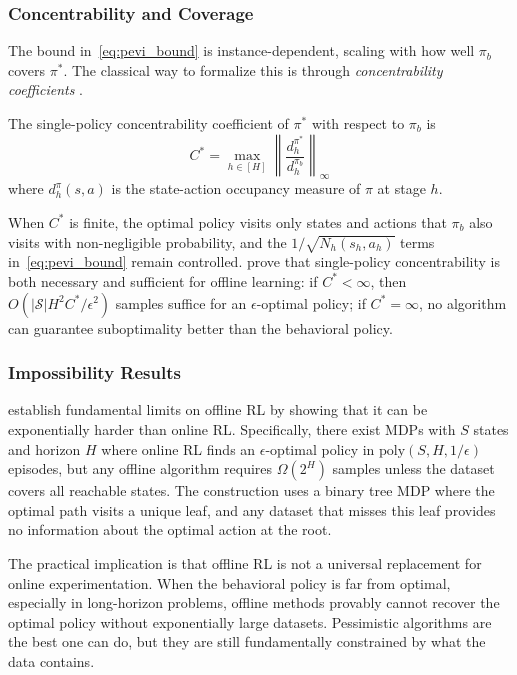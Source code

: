 \subsubsection{Concentrability and Coverage}

The bound in~\eqref{eq:pevi_bound} is instance-dependent, scaling with how well $\pi_b$ covers $\pi^*$. The classical way to formalize this is through \textit{concentrability coefficients} \citep{Munos2008}.

\begin{definition}
\label{def:concentrability}
The single-policy concentrability coefficient of $\pi^*$ with respect to $\pi_b$ is
\begin{equation}
C^* = \max_{h \in [H]} \left\| \frac{d_h^{\pi^*}}{d_h^{\pi_b}} \right\|_\infty
\end{equation}
where $d_h^{\pi}(s,a)$ is the state-action occupancy measure of $\pi$ at stage $h$.
\end{definition}

When $C^*$ is finite, the optimal policy visits only states and actions that $\pi_b$ also visits with non-negligible probability, and the $1/\sqrt{N_h(s_h, a_h)}$ terms in~\eqref{eq:pevi_bound} remain controlled. \citet{Rashidinejad2021} prove that single-policy concentrability is both necessary and sufficient for offline learning: if $C^* < \infty$, then $O(|\mathcal{S}| H^2 C^* / \epsilon^2)$ samples suffice for an $\epsilon$-optimal policy; if $C^* = \infty$, no algorithm can guarantee suboptimality better than the behavioral policy.

\subsubsection{Impossibility Results}

\citet{Zanette2021} establish fundamental limits on offline RL by showing that it can be exponentially harder than online RL. Specifically, there exist MDPs with $S$ states and horizon $H$ where online RL finds an $\epsilon$-optimal policy in $\text{poly}(S, H, 1/\epsilon)$ episodes, but any offline algorithm requires $\Omega(2^H)$ samples unless the dataset covers all reachable states. The construction uses a binary tree MDP where the optimal path visits a unique leaf, and any dataset that misses this leaf provides no information about the optimal action at the root.

The practical implication is that offline RL is not a universal replacement for online experimentation. When the behavioral policy is far from optimal, especially in long-horizon problems, offline methods provably cannot recover the optimal policy without exponentially large datasets. Pessimistic algorithms are the best one can do, but they are still fundamentally constrained by what the data contains.

